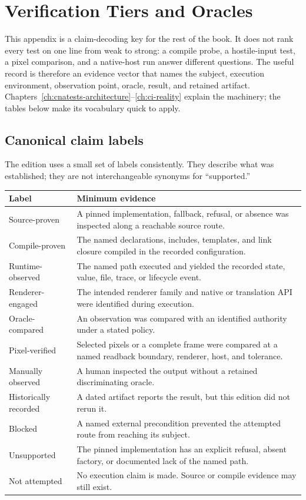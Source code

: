\chapter{Verification Tiers and Oracles}
\label{ch:verification-tiers}

This appendix is a claim-decoding key for the rest of the book.  It does not rank every test on
one line from weak to strong: a compile probe, a hostile-input test, a pixel comparison, and a
native-host run answer different questions.  The useful record is therefore an evidence vector
that names the subject, execution environment, observation point, oracle, result, and retained
artifact.  Chapters~\ref{ch:cnatests-architecture}--\ref{ch:ci-reality} explain the machinery; the
tables below make its vocabulary quick to apply.

\section{Canonical claim labels}

The edition uses a small set of labels consistently. They describe what was established; they
are not interchangeable synonyms for ``supported.''

\begin{center}
\small
\begin{tabularx}{\textwidth}{>{\raggedright\arraybackslash}p{2.8cm}X}
\toprule
\textbf{Label} & \textbf{Minimum evidence} \\
\midrule
Source-proven & A pinned implementation, fallback, refusal, or absence was inspected along a
  reachable source route. \\
Compile-proven & The named declarations, includes, templates, and link closure compiled in the
  recorded configuration. \\
Runtime-observed & The named path executed and yielded the recorded state, value, file, trace, or
  lifecycle event. \\
Renderer-engaged & The intended renderer family and native or translation API were identified
  during execution. \\
Oracle-compared & An observation was compared with an identified authority under a stated policy. \\
Pixel-verified & Selected pixels or a complete frame were compared at a named readback boundary,
  renderer, host, and tolerance. \\
Manually observed & A human inspected the output without a retained discriminating oracle. \\
Historically recorded & A dated artifact reports the result, but this edition did not rerun it. \\
Blocked & A named external precondition prevented the attempted route from reaching its subject. \\
Unsupported & The pinned implementation has an explicit refusal, absent factory, or documented
  lack of the named path. \\
Not attempted & No execution claim is made. Source or compile evidence may still exist. \\
\bottomrule
\end{tabularx}
\end{center}

